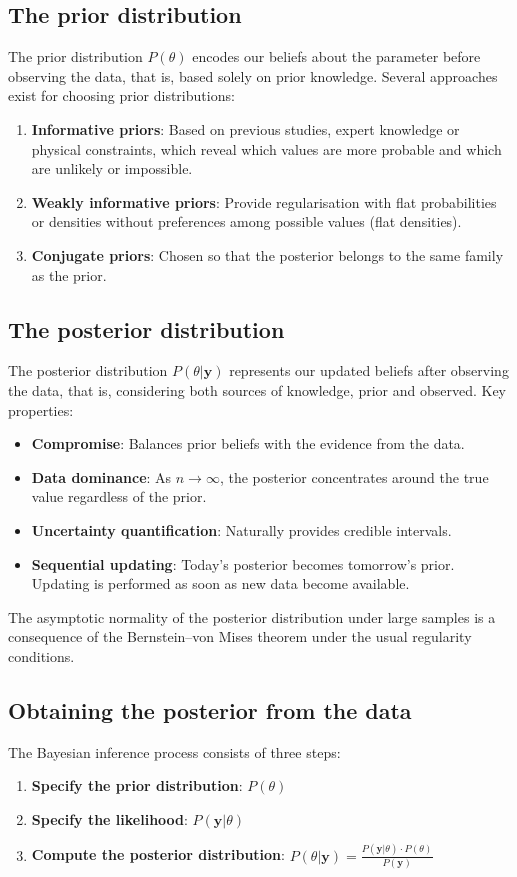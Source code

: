 \subsection{The prior distribution}
The prior distribution $P(\theta)$ encodes our beliefs about the parameter before observing the data, that is, based solely on prior knowledge. Several approaches exist for choosing prior distributions:
\begin{enumerate}
\item \textbf{Informative priors}: Based on previous studies, expert knowledge or physical constraints, which reveal which values are more probable and which are unlikely or impossible.
\item \textbf{Weakly informative priors}: Provide regularisation with flat probabilities or densities without preferences among possible values (flat densities).
\item \textbf{Conjugate priors}: Chosen so that the posterior belongs to the same family as the prior.
\end{enumerate}

\subsection{The posterior distribution}
The posterior distribution $P(\theta|\mathbf{y})$ represents our updated beliefs after observing the data, that is, considering both sources of knowledge, prior and observed. Key properties:
\begin{itemize}
\item \textbf{Compromise}: Balances prior beliefs with the evidence from the data.
\item \textbf{Data dominance}: As $n \to \infty$, the posterior concentrates around the true value regardless of the prior.
\item \textbf{Uncertainty quantification}: Naturally provides credible intervals.
\item \textbf{Sequential updating}: Today's posterior becomes tomorrow's prior. Updating is performed as soon as new data become available.
\end{itemize}

The asymptotic normality of the posterior distribution under large samples is a consequence of the Bernstein–von Mises theorem under the usual regularity conditions.

\subsection{Obtaining the posterior from the data}
The Bayesian inference process consists of three steps:
\begin{enumerate}
\item \textbf{Specify the prior distribution}: $P(\theta)$
\item \textbf{Specify the likelihood}: $P(\mathbf{y}|\theta)$
\item \textbf{Compute the posterior distribution}: $P(\theta|\mathbf{y}) = \frac{P(\mathbf{y}|\theta) \cdot P(\theta)}{P(\mathbf{y})}$
\end{enumerate}

